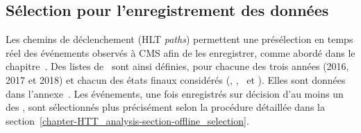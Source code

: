 \subsection{Sélection pour l'enregistrement des données}\label{chapter-HTT_analysis-section-triggers}
Les chemins de déclenchement (HLT \emph{paths}) permettent une présélection en temps réel des événements observés à CMS afin de les enregistrer, comme abordé dans le chapitre~.
Des listes de \HLTpaths\ sont ainsi définies, pour chacune des trois années (2016, 2017 et 2018) et chacun des états finaux considérés (\tauh\tauh, \mu\tauh, \ele\tauh\ et \ele\mu).
Elles sont données dans l'annexe~.
Les événements, une fois enregistrés sur décision d'au moins un des \HLTpaths, sont sélectionnés plus précisément selon la procédure détaillée dans la section~\ref{chapter-HTT_analysis-section-offline_selection}.

%
%
